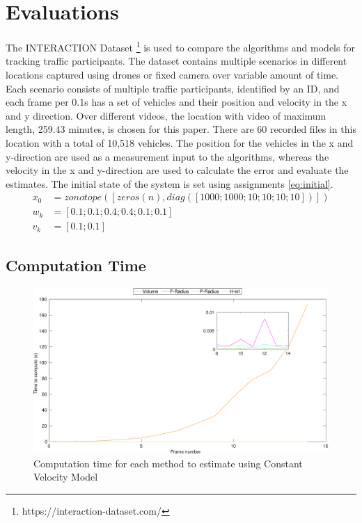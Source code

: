 \chapter{Evaluations} \label{ch:result}
The INTERACTION Dataset \footnote{https://interaction-dataset.com/} is used to compare the algorithms and models for tracking traffic participants. The dataset contains multiple scenarios in different locations captured using drones or fixed camera over variable amount of time. Each scenario consists of multiple traffic participants, identified by an ID, and each frame per 0.1s has a set of vehicles and their position and velocity in the x and y direction. Over different videos, the location with video of maximum length, 259.43 minutes, is chosen for this paper. There are 60 recorded files in this location with a total of 10,518 vehicles. The position for the vehicles in the x and y-direction are used as a measurement input to the algorithms, whereas the velocity in the x and y-direction are used to calculate the error and evaluate the estimates. The initial state of the system is set using assignments \eqref{eq:initial}.
\begin{equation}
\label{eq:initial}
\begin{split}
x_0 &= zonotope([zeros(n), diag([1000;1000;10;10;10;10])])\\
w_k &= [0.1;0.1;0.4;0.4;0.1;0.1]\\
v_k &= [0.1;0.1]
\end{split}
\end{equation}

\section{Computation Time}
\begin{figure}[htbp]
\centering
\includegraphics[width=\linewidth]{figures/timegraphh}
\caption{Computation time for each method to estimate using Constant Velocity Model}
\label{fig:timegraph}
\end{figure}


